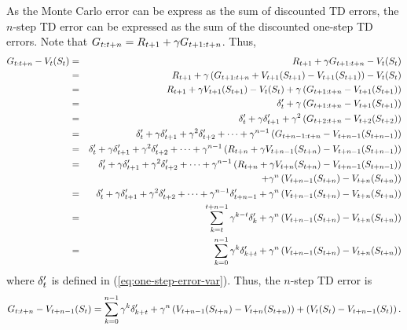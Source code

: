 As the Monte Carlo error can be express as the sum of discounted TD errors,
the $n$-step TD error can be expressed as the sum of the discounted one-step TD errors.
Note that $G_{{t}:{t+n}} = R_{t+1} + \gamma G_{{t+1}:{t+n}}$. Thus,
\begin{eqnarray*}
G_{{t}:{t+n}} - V_t(S_{t})
&=& R_{t+1} + \gamma G_{{t+1}:{t+n}} - V_t(S_{t})
\\
&=& R_{t+1} + \gamma \left( G_{{t+1}:{t+n}} + V_{t+1}(S_{t+1}) - V_{t+1}(S_{t+1}) \right)- V_t(S_{t})
\\
&=& R_{t+1} + \gamma V_{t+1}(S_{t+1}) - V_t(S_{t})
+ \gamma \left( G_{{t+1}:{t+n}} - V_{t+1}(S_{t+1}) \right)
\\
&=& \delta'_{t} + \gamma \left( G_{{t+1}:{t+n}} - V_{t+1}(S_{t+1}) \right)
\\
&=& \delta'_{t} + \gamma \delta'_{t+1} + \gamma^2 \left( G_{{t+2}:{t+n}} - V_{t+2}(S_{t+2}) \right)
\\
&=& \delta'_{t} + \gamma \delta'_{t+1} + \gamma^2 \delta'_{t+2} + \cdots 
+ \gamma^{n-1} \left( G_{{t+n-1}:{t+n}} - V_{t+n-1}(S_{t+n-1}) \right)
\\
&=& \delta'_{t} + \gamma \delta'_{t+1} + \gamma^2 \delta'_{t+2} + \cdots 
+ \gamma^{n-1} \left( R_{t+n} + \gamma V_{t+n-1}(S_{t+n}) - V_{t+n-1}(S_{t+n-1}) \right)
\\
&=& \delta'_{t} + \gamma \delta'_{t+1} + \gamma^2 \delta'_{t+2} + \cdots 
+ \gamma^{n-1} \left( R_{t+n} + \gamma V_{t+n}(S_{t+n}) - V_{t+n-1}(S_{t+n-1}) \right)
\\
&& + \gamma^{n} \left( V_{t+n-1}(S_{t+n}) - V_{t+n}(S_{t+n}) \right)
\\
&=& \delta'_{t} + \gamma \delta'_{t+1} + \gamma^2 \delta'_{t+2} + \cdots + \gamma^{n-1} \delta'_{t+n-1}
+ \gamma^{n} \left( V_{t+n-1}(S_{t+n}) - V_{t+n}(S_{t+n}) \right)
\\
&=& \sum_{k=t}^{t+n-1} \gamma^{k-t}\delta'_{k} + \gamma^{n} \left( V_{t+n-1}(S_{t+n}) - V_{t+n}(S_{t+n}) \right)
\\
&=& \sum_{k=0}^{n-1} \gamma^{k}\delta'_{k+t} + \gamma^{n} \left( V_{t+n-1}(S_{t+n}) - V_{t+n}(S_{t+n}) \right)
\end{eqnarray*}
where $\delta'_{t}$ is defined in (\ref{eq:one-step-error-var}).
Thus, the $n$-step TD error is
\begin{equation}
G_{{t}:{t+n}} - V_{t+n-1}(S_{t})
= \sum_{k=0}^{n-1} \gamma^{k}\delta'_{k+t}
+ \gamma^{n} \left( V_{t+n-1}(S_{t+n}) - V_{t+n}(S_{t+n}) \right)
+ \left(V_t(S_{t}) - V_{t+n-1}(S_{t})\right).
\end{equation}


